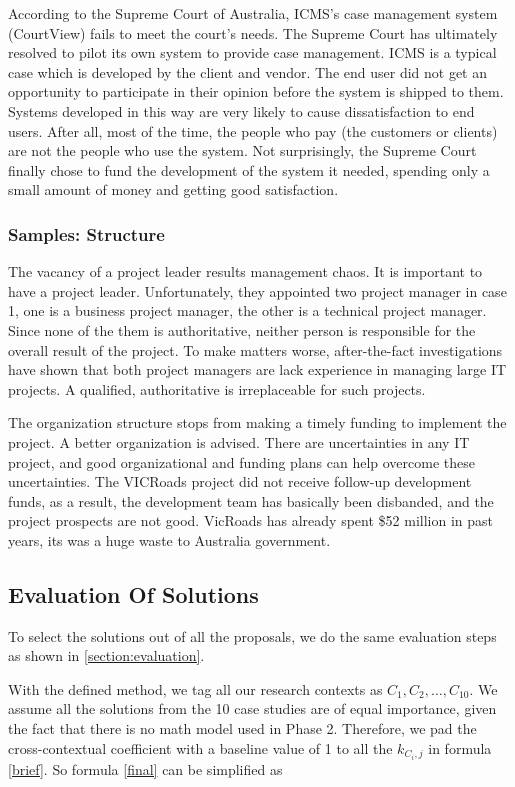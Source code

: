 According to the Supreme Court of Australia, ICMS’s case management system (CourtView) fails to meet the court’s needs. The Supreme Court has ultimately resolved to pilot its own system to provide case management. ICMS is a typical case which is developed by the client and vendor. The end user did not get an opportunity to participate in their opinion before the system is shipped to them. Systems developed in this way are very likely to cause dissatisfaction to end users. After all, most of the time, the people who pay (the customers or clients) are not the people who use the system. Not surprisingly, the Supreme Court finally chose to fund the development of the system it needed, spending only a small amount of money and getting good satisfaction.

\subsubsection{Samples: Structure}
The vacancy of a project leader results management chaos. It is important to have a project leader. Unfortunately, they appointed two project manager in case 1, one is a business project manager, the other is a technical project manager. Since none of the them is authoritative, neither person is responsible for the overall result of the project. To make matters worse, after-the-fact investigations have shown that both project managers are lack experience in managing large IT projects. A qualified, authoritative is irreplaceable for such projects.

The organization structure stops from making a timely funding to implement the project. A better organization is advised. There are uncertainties in any IT project, and good organizational and funding plans can help overcome these uncertainties. The VICRoads project did not receive follow-up development funds, as a result, the development team has basically been disbanded, and the project prospects are not good. VicRoads has already spent \$52 million in past years, its was a huge waste to Australia government. 


\subsection{Evaluation Of Solutions}
To select the solutions out of all the proposals, we do the same evaluation steps as shown in \ref{section:evaluation}.

With the defined method, we tag all our research contexts as $C_{1}, C_{2}, \ldots, C_{10}$. We assume all the solutions from the 10 case studies are of equal importance, given the fact that there is no math model used in Phase 2. Therefore, we pad the cross-contextual coefficient with a baseline value of 1 to all the $\mathit{k_{C_{i},j}}$ in formula \ref{brief}. So formula \ref{final} can be simplified as 

